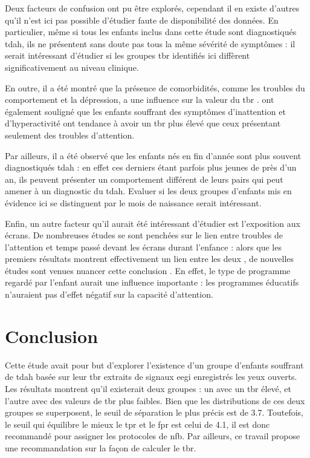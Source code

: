 Deux facteurs de confusion ont pu être explorés, cependant il en existe d'autres qu'il n'est ici pas possible d'étudier faute de disponibilité des données.
En particulier, même si tous les enfants inclus dans cette étude sont diagnostiqués \gls{tdah}, ils ne présentent sans doute pas tous la même sévérité de symptômes : il serait
intéressant d'étudier si les groupes \gls{tbr} identifiés ici diffèrent significativement au niveau clinique. 

En outre, il a été montré que la présence de comorbidités, comme les troubles du comportement et la dépression, a une influence sur la valeur du \gls{tbr} \citep{Loo2013}. 
\citet{Barry2003erp} ont également souligné que les enfants souffrant des symptômes d'inattention et d'hyperactivité ont tendance à avoir un \gls{tbr} plus élevé que ceux présentant seulement des
troubles d'attention.  

Par ailleurs, il a été observé que les enfants nés en fin d'année sont plus souvent diagnostiqués \gls{tdah} \citep{Layton2018} : en effet ces derniers 
étant parfois plus jeunes de près d'un an, ils peuvent présenter un comportement différent de leurs pairs qui peut amener à un diagnostic du \gls{tdah}. Evaluer si 
les deux groupes d'enfants mis en évidence ici se distinguent par le mois de naissance serait intéressant.

Enfin, un autre facteur qu'il aurait été intéressant d'étudier est l'exposition aux écrans. De nombreuses études se sont penchées sur le lien 
entre troubles de l'attention et temps passé devant les écrans durant l'enfance : alors que les premiers résultats montrent effectivement un lien 
entre les deux \citep{Swing2010, Christakis2004}, de nouvelles études sont venues nuancer cette conclusion \citep{Schmidt2008, Lillard2011, Zimmerman2007, Kostyrka2017}.
En effet, le type de programme regardé par l'enfant aurait une influence importante : les programmes éducatifs n'auraient pas d'effet négatif sur 
la capacité d'attention.


\section{Conclusion}

Cette étude avait pour but d'explorer l'existence d'un groupe d'enfants souffrant de \gls{tdah} basée sur leur \gls{tbr} extraits de signaux \gls{eegi} enregistrés les yeux 
ouverts. Les résultats montrent qu'il existerait deux groupes : un avec un \gls{tbr} élevé, et l'autre avec des valeurs de \gls{tbr} plus faibles. Bien que les 
distributions de ces deux groupes se superposent, le seuil de séparation le plus précis est de 3.7. Toutefois, le seuil qui équilibre le mieux
le \gls{tpr} et le \gls{fpr} est celui de 4.1, il est donc recommandé pour assigner les protocoles de \gls{nfb}. Par ailleurs, ce travail propose
une recommandation sur la façon de calculer le \gls{tbr}. 

